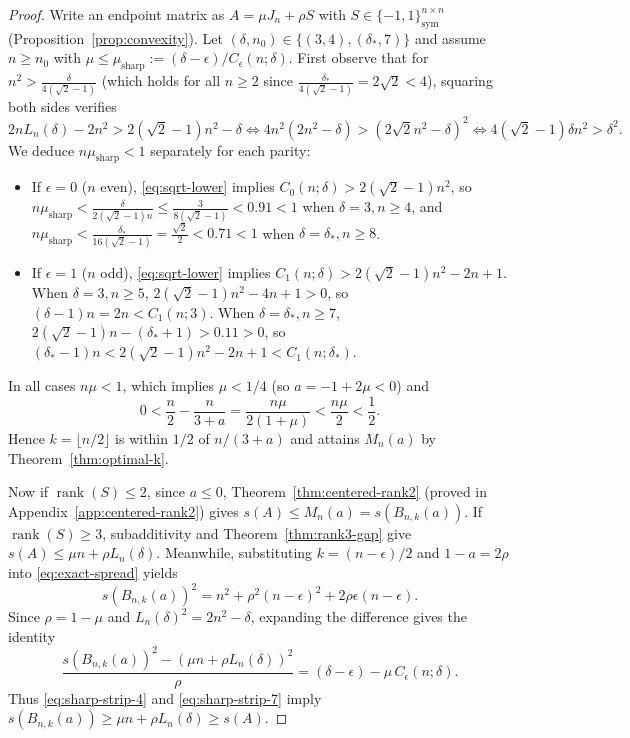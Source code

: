 \documentclass[11pt,reqno]{article}
\theoremstyle{definition}
\newcommand{\rank}{\operatorname{rank}}
\begin{document}
\begin{proof}
Write an endpoint matrix as $A = \mu J_n + \rho S$ with $S \in \{-1, 1\}^{n \times n}_{\text{sym}}$ (Proposition~\ref{prop:convexity}). Let $(\delta, n_0) \in \{(3, 4), (\delta_*, 7)\}$ and assume $n \ge n_0$ with $\mu \le \mu_{\text{sharp}} := (\delta - \epsilon)/C_\epsilon(n; \delta)$. First observe that for $n^2 > \frac{\delta}{4(\sqrt{2}-1)}$ (which holds for all $n \ge 2$ since $\frac{\delta_*}{4(\sqrt{2}-1)} = 2\sqrt{2} < 4$), squaring both sides verifies
\begin{equation}\label{eq:sqrt-lower}
2n L_n(\delta) - 2n^2 > 2(\sqrt{2} - 1)n^2 - \delta
\iff 4n^2(2n^2 - \delta) > (2\sqrt{2}n^2 - \delta)^2
\iff 4(\sqrt{2} - 1)\delta n^2 > \delta^2.
\end{equation}
We deduce $n\mu_{\text{sharp}} < 1$ separately for each parity:
\begin{itemize}
    \item If $\epsilon = 0$ ($n$ even), \eqref{eq:sqrt-lower} implies $C_0(n; \delta) > 2(\sqrt{2} - 1)n^2$, so $n\mu_{\text{sharp}} < \frac{\delta}{2(\sqrt{2}-1)n} \le \frac{3}{8(\sqrt{2}-1)} < 0.91 < 1$ when $\delta = 3, n \ge 4$, and $n\mu_{\text{sharp}} < \frac{\delta_*}{16(\sqrt{2}-1)} = \frac{\sqrt{2}}{2} < 0.71 < 1$ when $\delta = \delta_*, n \ge 8$.
    \item If $\epsilon = 1$ ($n$ odd), \eqref{eq:sqrt-lower} implies $C_1(n; \delta) > 2(\sqrt{2} - 1)n^2 - 2n + 1$. When $\delta = 3, n \ge 5$, $2(\sqrt{2}-1)n^2 - 4n + 1 > 0$, so $(\delta - 1)n = 2n < C_1(n; 3)$. When $\delta = \delta_*, n \ge 7$, $2(\sqrt{2}-1)n - (\delta_* + 1) > 0.11 > 0$, so $(\delta_* - 1)n < 2(\sqrt{2}-1)n^2 - 2n + 1 < C_1(n; \delta_*)$.
\end{itemize}
In all cases $n\mu < 1$, which implies $\mu < 1/4$ (so $a = -1 + 2\mu < 0$) and
\[
0 < \frac{n}{2} - \frac{n}{3 + a} = \frac{n\mu}{2(1+\mu)} < \frac{n\mu}{2} < \frac{1}{2}.
\]
Hence $k = \lfloor n/2 \rfloor$ is within $1/2$ of $n/(3+a)$ and attains $M_n(a)$ by Theorem~\ref{thm:optimal-k}.

Now if $\rank(S) \le 2$, since $a \le 0$, Theorem~\ref{thm:centered-rank2} (proved in Appendix~\ref{app:centered-rank2}) gives $s(A) \le M_n(a) = s(B_{n,k}(a))$. If $\rank(S) \ge 3$, subadditivity and Theorem~\ref{thm:rank3-gap} give $s(A) \le \mu n + \rho L_n(\delta)$. Meanwhile, substituting $k = (n-\epsilon)/2$ and $1 - a = 2\rho$ into \eqref{eq:exact-spread} yields
\[
s(B_{n, k}(a))^2 = n^2 + \rho^2(n - \epsilon)^2 + 2\rho\epsilon(n - \epsilon).
\]
Since $\rho = 1 - \mu$ and $L_n(\delta)^2 = 2n^2 - \delta$, expanding the difference gives the identity
\begin{equation}\label{eq:strip-comparison}
\frac{s(B_{n, k}(a))^2 - (\mu n + \rho L_n(\delta))^2}{\rho} = (\delta - \epsilon) - \mu\, C_\epsilon(n; \delta).
\end{equation}
Thus \eqref{eq:sharp-strip-4} and \eqref{eq:sharp-strip-7} imply $s(B_{n,k}(a)) \ge \mu n + \rho L_n(\delta) \ge s(A)$.


\end{proof}
\end{document}
